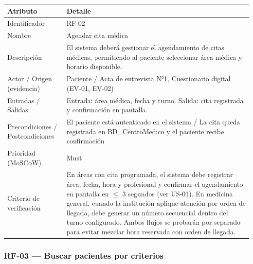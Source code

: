 \documentclass[11pt,a4paper]{article}
\begin{document}
	\begin{longtable}{p{} p{}}
		
		\toprule
		\textbf{Atributo} & \textbf{Detalle} \\
		\midrule
		\endhead
		
		Identificador & RF-02 \\
		Nombre & Agendar cita médica \\
		Descripción & El sistema deberá gestionar el agendamiento de citas médicas, permitiendo al paciente seleccionar área médica y horario disponible. \\
		Actor / Origen (evidencia) & Paciente / Acta de entrevista N°1, Cuestionario digital (EV-01, EV-02) \\
		Entradas / Salidas & Entrada: área médica, fecha y turno. Salida: cita registrada y confirmación en pantalla. \\
		Precondiciones / Postcondiciones & El paciente está autenticado en el sistema / La cita queda registrada en BD\_CentroMedico y el paciente recibe confirmación \\
		Prioridad (MoSCoW) & Must \\
		Criterio de verificación & En áreas con cita programada, el sistema debe registrar área, fecha, hora y profesional y confirmar el agendamiento en pantalla en \(\leq\) 3 segundos (ver US-01). En medicina general, cuando la institución aplique atención por orden de llegada, debe generar un número secuencial dentro del turno configurado. Ambos flujos se probarán por separado para evitar mezclar hora reservada con orden de llegada. \\
		
		\bottomrule
		
	\end{longtable}
	
	\subsubsection{RF-03 --- Buscar pacientes por criterios}
	
\end{document}
